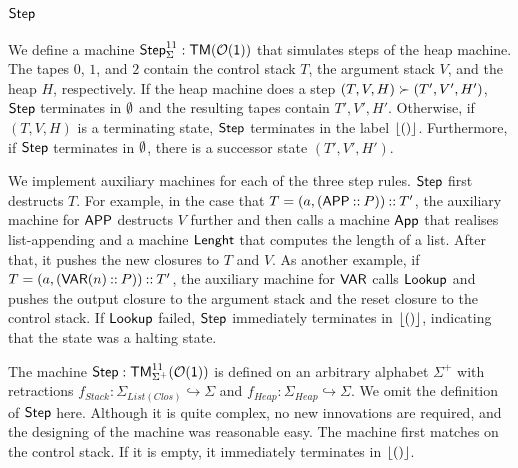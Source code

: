 \subsection{$\mathsf{Step}$}
\label{sec:heap-Step}
%


We define a machine $\mathsf{Step}_\Sigma^{11} : \mathsf{TM}(\mathcal{O}(\mathsf{1}))$ that simulates steps of the heap machine.  The tapes $0$, $1$, and $2$ contain the
control stack $T$, the argument stack $V$, and the heap $H$, respectively.  If the heap machine does a step $(T,V,H) \succ (T',V',H')$, $\mathsf{Step}$
terminates in $\emptyset$ and the resulting tapes contain $T',V',H'$.  Otherwise, if $(T,V,H)$ is a terminating state, $\mathsf{Step}$ terminates in the label
$\left\lfloor {\ensuremath{\mathsf{()}}} \right\rfloor$.  Furthermore, if $\mathsf{Step}$ terminates in $\emptyset$, there is a successor state $(T',V',H')$.

We implement auxiliary machines for each of the three step rules.  $\mathsf{Step}$ first destructs $T$.  For example, in the case that
$T=(a, (\mathsf{APP} \mathbin{::} P)) \mathbin{::} T'$, the auxiliary machine for $\mathsf{APP}$ destructs $V$ further and then calls a machine $\mathsf{App}$ that realises
list-appending and a machine $\mathsf{Lenght}$ that computes the length of a list.  After that, it pushes the new closures to $T$ and $V$.  As another
example, if $T=(a, (\mathsf{VAR}(n) \mathbin{::} P)) \mathbin{::} T'$, the auxiliary machine for $\mathsf{VAR}$ calls $\mathsf{Lookup}$ and pushes the output closure to the
argument stack and the reset closure to the control stack.  If $\mathsf{Lookup}$ failed, $\mathsf{Step}$ immediately terminates in $\left\lfloor {\ensuremath{\mathsf{()}}} \right\rfloor$, indicating
that the state was a halting state.

The machine $\mathsf{Step} : \mathsf{TM}_{\Sigma^+}^{11}(\mathcal{O}(\mathsf{1}))$ is defined on an arbitrary alphabet $\Sigma^+$ with retractions
$f_{Stack} : \Sigma_{List(Clos)} \hookrightarrow \Sigma$ and $f_{Heap} : \Sigma_{Heap} \hookrightarrow \Sigma$.  We omit the definition of $\mathsf{Step}$
here.  Although it is quite complex, no new innovations are required, and the designing of the machine was reasonable easy.  The machine first matches
on the control stack.  If it is empty, it immediately terminates in $\left\lfloor {\ensuremath{\mathsf{()}}} \right\rfloor$.

